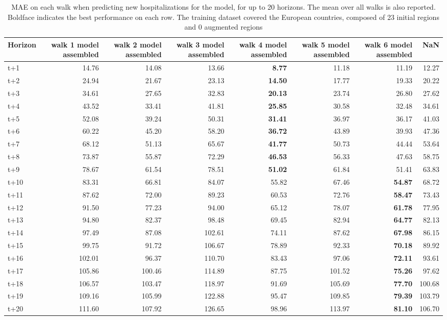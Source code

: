 \begin{table}[H]
\centering
\caption{MAE on each walk when predicting new hospitalizations for the model, for up to 20 horizons. The mean over all walks is also reported. Boldface indicates the best performance on each row. The training dataset covered the European countries, composed of 23 initial regions and 0 augmented regions }
\label{tab:MAE_walk_assembly}
\begin{tabular}{lrrrrrrr}
\toprule
Horizon &  walk 1 model assembled &  walk 2 model assembled &  walk 3 model assembled &  walk 4 model assembled &  walk 5 model assembled &  walk 6 model assembled &    NaN \\
\midrule
t+1  & 14.76  & 14.08  & 13.66  & \textbf{8.77}  & 11.18  & 11.19  & 12.27  \\
t+2  & 24.94  & 21.67  & 23.13  & \textbf{14.50}  & 17.77  & 19.33  & 20.22  \\
t+3  & 34.61  & 27.65  & 32.83  & \textbf{20.13}  & 23.74  & 26.80  & 27.62  \\
t+4  & 43.52  & 33.41  & 41.81  & \textbf{25.85}  & 30.58  & 32.48  & 34.61  \\
t+5  & 52.08  & 39.24  & 50.31  & \textbf{31.41}  & 36.97  & 36.17  & 41.03  \\
t+6  & 60.22  & 45.20  & 58.20  & \textbf{36.72}  & 43.89  & 39.93  & 47.36  \\
t+7  & 68.12  & 51.13  & 65.67  & \textbf{41.77}  & 50.73  & 44.44  & 53.64  \\
t+8  & 73.87  & 55.87  & 72.29  & \textbf{46.53}  & 56.33  & 47.63  & 58.75  \\
t+9  & 78.67  & 61.54  & 78.51  & \textbf{51.02}  & 61.84  & 51.41  & 63.83  \\
t+10  & 83.31  & 66.81  & 84.07  & 55.82  & 67.46  & \textbf{54.87}  & 68.72  \\
t+11  & 87.62  & 72.00  & 89.23  & 60.53  & 72.76  & \textbf{58.47}  & 73.43  \\
t+12  & 91.50  & 77.23  & 94.00  & 65.12  & 78.07  & \textbf{61.78}  & 77.95  \\
t+13  & 94.80  & 82.37  & 98.48  & 69.45  & 82.94  & \textbf{64.77}  & 82.13  \\
t+14  & 97.49  & 87.08  & 102.61  & 74.11  & 87.62  & \textbf{67.98}  & 86.15  \\
t+15  & 99.75  & 91.72  & 106.67  & 78.89  & 92.33  & \textbf{70.18}  & 89.92  \\
t+16  & 102.01  & 96.37  & 110.70  & 83.43  & 97.06  & \textbf{72.11}  & 93.61  \\
t+17  & 105.86  & 100.46  & 114.89  & 87.75  & 101.52  & \textbf{75.26}  & 97.62  \\
t+18  & 106.57  & 103.47  & 118.97  & 91.69  & 105.69  & \textbf{77.70}  & 100.68  \\
t+19  & 109.16  & 105.99  & 122.88  & 95.47  & 109.85  & \textbf{79.39}  & 103.79  \\
t+20  & 111.60  & 107.92  & 126.65  & 98.96  & 113.97  & \textbf{81.10}  & 106.70  \\

\bottomrule
\end{tabular}
\end{table}
